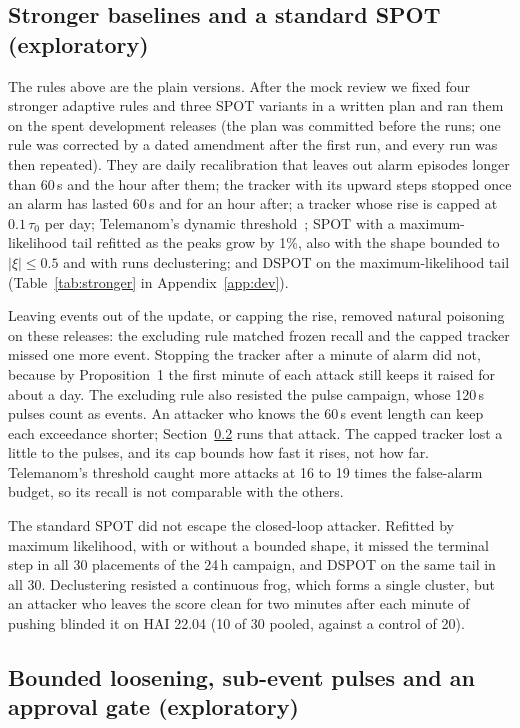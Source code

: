 \documentclass[sigconf]{acmart}
\begin{document}
\subsection{Stronger baselines and a standard SPOT (exploratory)}
\label{sec:stronger}

The rules above are the plain versions. After the mock review we fixed four stronger adaptive rules and
three SPOT variants in a written plan and ran them on the spent development releases (the plan was
committed before the runs; one rule was corrected by a dated amendment after the first run, and every
run was then repeated). They are daily recalibration that leaves out alarm episodes longer than 60\,s and
the hour after them; the tracker with its upward steps stopped once an alarm has lasted 60\,s and for an
hour after; a tracker whose rise is capped at $0.1\,\tau_0$ per day; Telemanom's dynamic
threshold~\cite{hundman2018telemanom}; SPOT with a maximum-likelihood tail refitted as the peaks grow by
1\%, also with the shape bounded to $|\xi| \le 0.5$ and with runs declustering; and DSPOT on the
maximum-likelihood tail (Table~\ref{tab:stronger} in Appendix~\ref{app:dev}).


Leaving events out of the update, or capping the rise, removed natural poisoning on these releases: the excluding rule matched frozen recall and the capped tracker missed one more event. Stopping the tracker after a minute of alarm did not, because by
Proposition~1 the first minute of each attack still keeps it raised for about a day. The excluding rule
also resisted the pulse campaign, whose 120\,s pulses count as events. An attacker who knows the 60\,s
event length can keep each exceedance shorter; Section~\ref{sec:bounded} runs that attack. The capped tracker lost a little to the pulses, and
its cap bounds how fast it rises, not how far. Telemanom's threshold caught more attacks at 16 to 19 times
the false-alarm budget, so its recall is not comparable with the others.

The standard SPOT did not escape the closed-loop attacker. Refitted by maximum likelihood, with or without
a bounded shape, it missed the terminal step in all 30 placements of the 24\,h campaign, and DSPOT on the
same tail in all 30. Declustering resisted a continuous frog, which forms a single cluster, but an
attacker who leaves the score clean for two minutes after each minute of pushing blinded it on HAI 22.04
(10 of 30 pooled, against a control of 20).

\subsection{Bounded loosening, sub-event pulses and an approval gate (exploratory)}
\label{sec:bounded}
\end{document}
